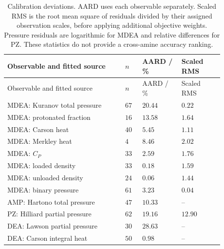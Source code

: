 \begin{longtable}{@{}>{\raggedright\arraybackslash}p{0.48\linewidth}>{\raggedright\arraybackslash}p{0.07\linewidth}>{\raggedright\arraybackslash}p{0.16\linewidth}>{\raggedright\arraybackslash}p{0.17\linewidth}@{}}
\caption{Calibration deviations. AARD uses each observable separately. Scaled RMS is the root mean square of residuals divided by their assigned observation scales, before applying additional objective weights. Pressure residuals are logarithmic for MDEA and relative differences for PZ. These statistics do not provide a cross-amine accuracy ranking.}\label{tab:p2-calibration}\\
\toprule Observable and fitted source & $n$ & AARD / \% & Scaled RMS \\ \midrule\endfirsthead
\toprule Observable and fitted source & $n$ & AARD / \% & Scaled RMS \\ \midrule\endhead
\bottomrule\endfoot
MDEA: Kuranov total pressure & $67$ & $20.44$ & $0.22$ \\
MDEA: protonated fraction & $16$ & $13.58$ & $1.64$ \\
MDEA: Carson heat & $40$ & $5.45$ & $1.11$ \\
MDEA: Merkley heat & $4$ & $8.46$ & $2.02$ \\
MDEA: $C_P$ & $33$ & $2.59$ & $1.76$ \\
MDEA: loaded density & $33$ & $0.18$ & $1.59$ \\
MDEA: unloaded density & $24$ & $0.06$ & $1.44$ \\
MDEA: binary pressure & $61$ & $3.23$ & $0.04$ \\
AMP: Hartono total pressure & $47$ & $10.33$ & -- \\
PZ: Hilliard partial pressure & $62$ & $19.16$ & $12.90$ \\
DEA: Lawson partial pressure & $30$ & $28.63$ & -- \\
DEA: Carson integral heat & $50$ & $0.98$ & -- \\
\end{longtable}\endgroup
